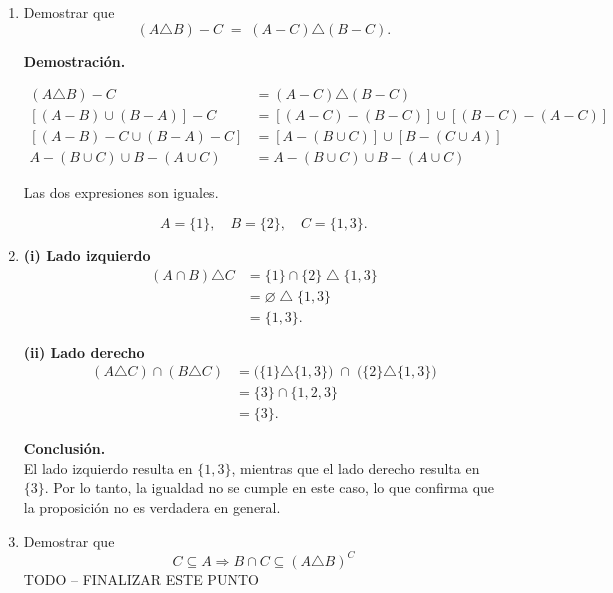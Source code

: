 \documentclass[11pt]{article}
\begin{document}
\begin{enumerate}[label=\roman*)]
\item Demostrar que
\[
(A \triangle B) - C \;=\; (A - C) \triangle (B - C).
\]

\textbf{Demostración.} 

\begin{align*}
    (A \triangle B) - C &= (A - C) \triangle (B - C ) \\
    [(A - B) \cup (B - A)] - C &= [(A - C) - (B - C)] \cup [(B - C) - (A - C)] \\
    [(A - B) - C \cup (B - A) - C] &= [A - (B \cup C)] \cup [B - (C \cup A)] \\
    A - (B \cup C) \cup B - (A \cup C) &= A - (B \cup C) \cup B - (A \cup C)
\end{align*}

Las dos expresiones son iguales.

\[
    A = \{1\}, \quad B = \{2\}, \quad C = \{1,3\}.
\]

\item 
\textbf{(i) Lado izquierdo}
\begin{align*}
(A \cap B) \triangle C 
&= \{1\}\cap\{2\} \;\triangle\; \{1,3\} \\
&= \varnothing \;\triangle\; \{1,3\} \\
&= \{1,3\}.
\end{align*}

\textbf{(ii) Lado derecho}
\begin{align*}
(A \triangle C)\cap(B \triangle C) 
&= \big(\{1\}\triangle\{1,3\}\big) \;\cap\; \big(\{2\}\triangle\{1,3\}\big) \\
&= \{3\}\cap\{1,2,3\} \\
&= \{3\}.
\end{align*}

\textbf{Conclusión.} \\
El lado izquierdo resulta en $\{1,3\}$, mientras que el lado derecho resulta en $\{3\}$. 
Por lo tanto, la igualdad no se cumple en este caso, lo que confirma que la proposición no es verdadera en general.

\item Demostrar que 
\[
    C \subseteq A \Rightarrow B \cap C \subseteq (A \triangle B)^{C}
\]
TODO -- FINALIZAR ESTE PUNTO
\end{enumerate}

\subsection{}
\end{document}
